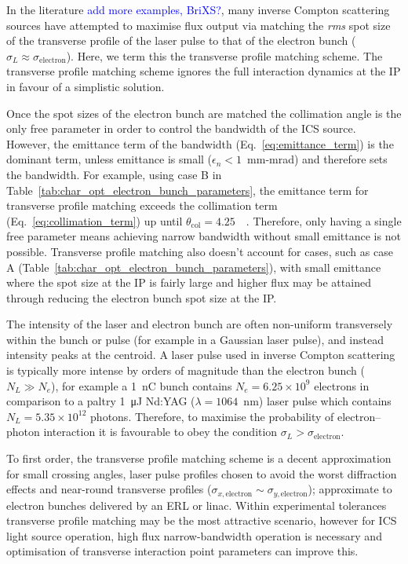 \documentclass[../main.tex]{subfiles}
\begin{document}
In the literature \cite{akagi2016narrow,deitrick2018high,jacquet2015radiation} \textcolor{blue}{add more examples, BriXS?}, many inverse Compton scattering sources have attempted to maximise flux output via matching the \textit{rms} spot size of the transverse profile of the laser pulse to that of the electron bunch ($\sigma_{L}\approx\sigma_{\mathrm{electron}}$). Here, we term this the transverse profile matching scheme. The transverse profile matching scheme ignores the full interaction dynamics at the IP in favour of a simplistic solution. 

Once the spot sizes of the electron bunch are matched the collimation angle is the only free parameter in order to control the bandwidth of the ICS source. However, the emittance term of the bandwidth (Eq.~\ref{eq:emittance_term}) is the dominant term, unless emittance is small ($\epsilon_{n} < 1$~\si{\milli\meter}-\si{\milli\radian}) and therefore sets the bandwidth. For example, using case B in Table~\ref{tab:char_opt_electron_bunch_parameters}, the emittance term for transverse profile matching exceeds the collimation term (Eq.~\ref{eq:collimation_term}) up until $\theta_{\mathrm{col}} = 4.25$~\si{\milli\rad}. Therefore, only having a single free parameter means achieving narrow bandwidth without small emittance is not possible. Transverse profile matching also doesn't account for cases, such as case A (Table~\ref{tab:char_opt_electron_bunch_parameters}), with small emittance where the spot size at the IP is fairly large and higher flux may be attained through reducing the electron bunch spot size at the IP. 

The intensity of the laser and electron bunch are often non-uniform transversely within the bunch or pulse (for example in a Gaussian laser pulse), and instead intensity peaks at the centroid. A laser pulse used in inverse Compton scattering is typically more intense by orders of magnitude than the electron bunch ($N_{L} \gg N_{e}$), for example a 1~\si{\nano\coulomb} bunch contains $N_{e} = 6.25\times 10^{9}$ electrons in comparison to a paltry 1~\si{\micro\joule} Nd:YAG ($\lambda = 1064$~\si{\nano\meter}) laser pulse which contains $N_{L} = 5.35\times 10^{12}$ photons. Therefore, to maximise the probability of electron--photon interaction it is favourable to obey the condition $\sigma_{L} > \sigma_{\mathrm{electron}}$.

To first order, the transverse profile matching scheme is a decent approximation for small crossing angles, laser pulse profiles chosen to avoid the worst diffraction effects and near-round transverse profiles ($\sigma_{x,\mathrm{electron}}\sim\sigma_{y,\mathrm{electron}}$); approximate to electron bunches delivered by an ERL or linac. Within experimental tolerances transverse profile matching may be the most attractive scenario, however for ICS light source operation, high flux narrow-bandwidth operation is necessary and optimisation of transverse interaction point parameters can improve this. 
\end{document}
